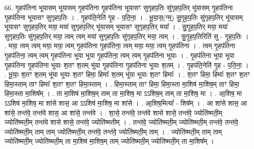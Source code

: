\documentclass[17pt]{extarticle}
\begin{document}
66. गृ॒हप॑तिना भूयासम् भूयासम् गृ॒हप॑तिना गृ॒हप॑तिना भूयासꣳ सुगृहप॒तिः सु॑गृहप॒तिर् भू॑यासम् गृ॒हप॑तिना गृ॒हप॑तिना भूयासꣳ सुगृहप॒तिः । . गृ॒हप॑ति॒नेति॑ गृ॒ह - प॒ति॒ना॒ । . भू॒या॒स॒(ग्म्॒) सु॒गृ॒ह॒प॒तिः सु॑गृहप॒तिर् भू॑यासम् भूयासꣳ सुगृहप॒तिर् मया॒ मया॑ सुगृहप॒तिर् भू॑यासम् भूयासꣳ सुगृहप॒तिर् मया᳚ । . सु॒गृ॒ह॒प॒तिर् मया॒ मया॑ सुगृहप॒तिः सु॑गृहप॒तिर् मया॒ त्वम् त्वम् मया॑ सुगृहप॒तिः सु॑गृहप॒तिर् मया॒ त्वम् । . सु॒गृ॒ह॒प॒तिरिति॑ सु - गृ॒ह॒प॒तिः । . मया॒ त्वम् त्वम् मया॒ मया॒ त्वम् गृ॒हप॑तिना गृ॒हप॑तिना॒ त्वम् मया॒ मया॒ त्वम् गृ॒हप॑तिना । . त्वम् गृ॒हप॑तिना गृ॒हप॑तिना॒ त्वम् त्वम् गृ॒हप॑तिना भूया भूया गृ॒हप॑तिना॒ त्वम् त्वम् गृ॒हप॑तिना भूयाः । . गृ॒हप॑तिना भूया भूया गृ॒हप॑तिना गृ॒हप॑तिना भूयाः श॒तꣳ श॒तम् भू॑या गृ॒हप॑तिना गृ॒हप॑तिना भूयाः श॒तम् । . गृ॒हप॑ति॒नेति॑ गृ॒ह - प॒ति॒ना॒ । . भू॒याः॒ श॒तꣳ श॒तम् भू॑या भूयाः श॒तꣳ हिमा॒ हिमाः᳚ श॒तम् भू॑या भूयाः श॒तꣳ हिमाः᳚ । . श॒तꣳ हिमा॒ हिमाः᳚ श॒तꣳ श॒तꣳ हिमा॒स्ताम् ताꣳ हिमाः᳚ श॒तꣳ श॒तꣳ हिमा॒स्ताम् । . हिमा॒स्ताम् ताꣳ हिमा॒ हिमा॒स्ता मा॒शिष॑ मा॒शिष॒म् ताꣳ हिमा॒ हिमा॒स्ता मा॒शिष᳚म् । . ता मा॒शिष॑ मा॒शिष॒म् ताम् ता मा॒शिष॒ मा ऽऽशिष॒म् ताम् ता मा॒शिष॒ मा । . आ॒शिष॒ मा ऽऽशिष॑ मा॒शिष॒ मा शा॑से शास॒ आ ऽऽशिष॑ मा॒शिष॒ मा शा॑से । . आ॒शिष॒मित्या᳚ - शिष᳚म् । . आ शा॑से शास॒ आ शा॑से॒ तन्त॑वे॒ तन्त॑वे शास॒ आ शा॑से॒ तन्त॑वे । . शा॒से॒ तन्त॑वे॒ तन्त॑वे शासे शासे॒ तन्त॑वे॒ ज्योति॑ष्मती॒म् ज्योति॑ष्मती॒म् तन्त॑वे शासे शासे॒ तन्त॑वे॒ ज्योति॑ष्मतीम् । . तन्त॑वे॒ ज्योति॑ष्मती॒म् ज्योति॑ष्मती॒म् तन्त॑वे॒ तन्त॑वे॒ ज्योति॑ष्मती॒म् ताम् ताम् ज्योति॑ष्मती॒म् तन्त॑वे॒ तन्त॑वे॒ ज्योति॑ष्मती॒म् ताम् । . ज्योति॑ष्मती॒म् ताम् ताम् ज्योति॑ष्मती॒म् ज्योति॑ष्मती॒म् ता मा॒शिष॑ मा॒शिष॒म् ताम् ज्योति॑ष्मती॒म् ज्योति॑ष्मती॒म् ता मा॒शिष᳚म् । \newline
\end{document}
